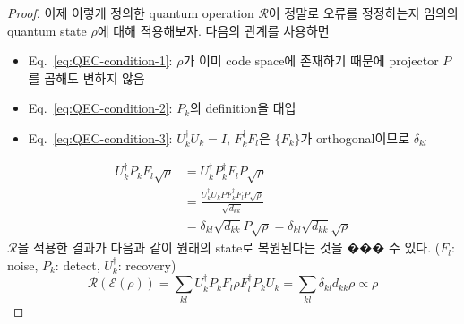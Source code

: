 \begin{proof}
    이제 이렇게 정의한 quantum operation $\mathcal R$이 정말로 오류를 정정하는지 임의의 quantum state $\rho$에 대해 적용해보자. 다음의 관계를 사용하면
    \begin{itemize}
        \item Eq.~\eqref{eq:QEC-condition-1}: $\rho$가 이미 code space에 존재하기 때문에 projector $P$를 곱해도 변하지 않음
        \item Eq.~\eqref{eq:QEC-condition-2}: $P_k$의 definition을 대입
        \item Eq.~\eqref{eq:QEC-condition-3}: $U_k^\dagger U_k = I$, $F_k^\dagger F_l$은 $\{F_k\}$가 orthogonal이므로 $\delta_{k l}$
    \end{itemize}
    \begin{align}
        U_k^{\dagger} P_k F_l \sqrt{\rho} &= U_k^{\dagger} P_k^{\dagger} F_l P \sqrt{\rho} \label{eq:QEC-condition-1} \\
                                        &=\frac{U_k^{\dagger} U_k P F_k^{\dagger} F_l P \sqrt{\rho}}{\sqrt{d_{k k}}} \label{eq:QEC-condition-2} \\
                                        &=\delta_{k l} \sqrt{d_{k k}} P \sqrt{\rho} = \delta_{k l} \sqrt{d_{k k}} \sqrt{\rho} \label{eq:QEC-condition-3}
    \end{align}
    $\mathcal R$을 적용한 결과가 다음과 같이 원래의 state로 복원된다는 것을 ��� 수 있다. ($F_l$: noise, $P_k$: detect, $U_k^\dagger$: recovery)
    \begin{equation*}
        \mathcal{R}(\mathcal{E}(\rho))=\sum_{k l} U_k^{\dagger} P_k F_l \rho F_l^{\dagger} P_k U_k=\sum_{k l} \delta_{k l} d_{k k} \rho \propto \rho
    \end{equation*}
    

\end{proof}
